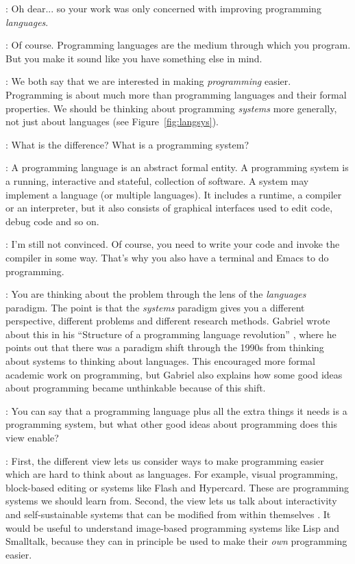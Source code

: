 \documentclass[runningheads]{llncs}
\newcommand{\T}{Tomas}
\newcommand{\J}{Joel}
\newcommand{\says}[2][gg]{\vspace{0.5em}\noindent\hangindent=0.5cm{\textsc{#1}}: #2}
\begin{document}
\says[\J]{Oh dear... so your work was only concerned with improving programming \emph{languages}.}

\says[\T]{Of course. Programming languages are the medium through which you program. But you make it sound like you have something else in mind.}

\says[\J]{We both say that we are interested in making \emph{programming} easier. Programming is about much more than programming languages and their formal properties. We should be thinking about programming \emph{systems} more generally, not just about languages (see Figure~\ref{fig:langsys}).}

\says[\T]{What is the difference? What is a programming system?}

\says[\J]{A programming language is an abstract formal entity. A programming system is a running, interactive and stateful, collection of software. A system may implement a language (or multiple languages). It includes a runtime, a compiler or an interpreter, but it also consists of graphical interfaces used to edit code, debug code and so on.}

\says[\T]{I'm still not convinced. Of course, you need to write your code and invoke the compiler in some way. That's why you also have a terminal and Emacs to do programming.}

\says[\J]{You are thinking about the problem through the lens of the \emph{languages} paradigm. The point is that the \emph{systems} paradigm gives you a different perspective, different problems and different research methods. Gabriel wrote about this in his ``Structure of a programming language revolution'' \cite{rpg-2012-revolution}, where he points out that there was a paradigm shift through the 1990s from thinking about systems to thinking about languages. This encouraged more formal academic work on programming, but Gabriel also explains how some good ideas about programming became unthinkable because of this shift.}

\says[\T]{You can say that a programming language plus all the extra things it needs is a programming system, but what other good ideas about programming does this view enable?}

\says[\J]{First, the different view lets us consider ways to make programming easier which are hard to think about as languages. For example, visual programming, block-based editing \cite{resnick-2009-scratch} or systems like Flash \cite{ankerson-2018-dot} and Hypercard. These are programming systems we should learn from. Second, the view lets us talk about interactivity and self-sustainable systems that can be modified from within themselves \cite{hirschfeld-2008-s3,hirschfeld-2010-s3}. It would be useful to understand image-based programming systems like Lisp and Smalltalk, because they can in principle be used to make their \emph{own} programming easier.}
\end{document}
